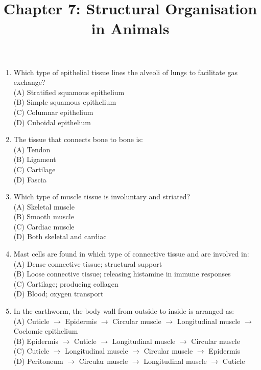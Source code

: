 \documentclass{article}
\begin{document}
\title{Chapter 7: Structural Organisation in Animals}
\date{}
\maketitle

\begin{enumerate}[label=Q\arabic*.]

\item Which type of epithelial tissue lines the alveoli of lungs to facilitate gas exchange?
\\(A) Stratified squamous epithelium
\\(B) Simple squamous epithelium
\\(C) Columnar epithelium
\\(D) Cuboidal epithelium

\item The tissue that connects bone to bone is:
\\(A) Tendon
\\(B) Ligament
\\(C) Cartilage
\\(D) Fascia

\item Which type of muscle tissue is involuntary and striated?
\\(A) Skeletal muscle
\\(B) Smooth muscle
\\(C) Cardiac muscle
\\(D) Both skeletal and cardiac

\item Mast cells are found in which type of connective tissue and are involved in:
\\(A) Dense connective tissue; structural support
\\(B) Loose connective tissue; releasing histamine in immune responses
\\(C) Cartilage; producing collagen
\\(D) Blood; oxygen transport

\item In the earthworm, the body wall from outside to inside is arranged as:
\\(A) Cuticle $\rightarrow$ Epidermis $\rightarrow$ Circular muscle $\rightarrow$ Longitudinal muscle $\rightarrow$ Coelomic epithelium
\\(B) Epidermis $\rightarrow$ Cuticle $\rightarrow$ Longitudinal muscle $\rightarrow$ Circular muscle
\\(C) Cuticle $\rightarrow$ Longitudinal muscle $\rightarrow$ Circular muscle $\rightarrow$ Epidermis
\\(D) Peritoneum $\rightarrow$ Circular muscle $\rightarrow$ Longitudinal muscle $\rightarrow$ Cuticle


\end{enumerate}
\end{document}
